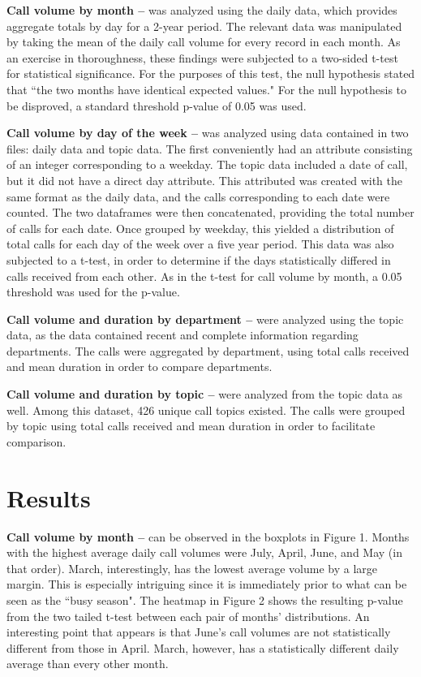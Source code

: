 \documentclass{article}
\begin{document}
\textbf{Call volume by month --} was analyzed using the daily data, which provides aggregate totals by day for a 2-year period. The relevant data was manipulated by taking the mean of the daily call volume for every record in each month.  As an exercise in thoroughness, these findings were subjected to a two-sided t-test for statistical significance.  For the purposes of this test, the null hypothesis stated that ``the two months have identical expected values."  For the null hypothesis to be disproved, a standard threshold p-value of 0.05 was used.
\par
\textbf{Call volume by day of the week --} was analyzed using data contained in two files: daily data and topic data.  The first conveniently had an attribute consisting of an integer corresponding to a weekday.  The topic data included a date of call, but it did not have a direct day attribute.  This attributed was created with the same format as the daily data, and the calls corresponding to each date were counted.  The two dataframes were then concatenated, providing the total number of calls for each date.  Once grouped by weekday, this yielded a distribution of total calls for each day of the week over a five year period.  This data was also subjected to a t-test, in order to determine if the days statistically differed in calls received from each other.  As in the t-test for call volume by month, a 0.05 threshold was used for the p-value.
\par
\textbf{Call volume and duration by department --} were analyzed using the topic data, as the data contained recent and complete information regarding departments.  The calls were aggregated by department, using total calls received and mean duration in order to compare departments.
\par
\textbf{Call volume and duration by topic --} were analyzed from the topic data as well.  Among this dataset, 426 unique call topics existed.  The calls were grouped by topic using total calls received and mean duration in order to facilitate comparison.


\section{Results}

\textbf{Call volume by month --} can be observed in the boxplots in Figure 1.  Months with the highest average daily call volumes were July, April, June, and May (in that order).  March, interestingly, has the lowest average volume by a large margin.  This is especially intriguing since it is immediately prior to what can be seen as the ``busy season".  The heatmap in Figure 2 shows the resulting p-value from the two tailed t-test between each pair of months' distributions.  An interesting point that appears is that June's call volumes are not statistically different from those in April.  March, however, has a statistically different daily average than every other month.
\par
\end{document}
